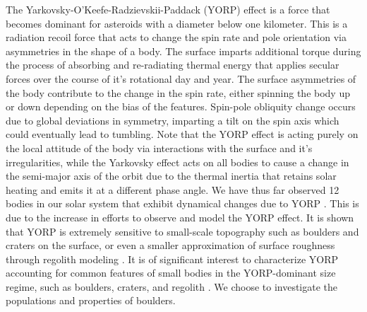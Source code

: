 The Yarkovsky-O'Keefe-Radzievskii-Paddack (YORP) effect is a force that becomes dominant for asteroids with a diameter below one kilometer. This is a radiation recoil force that acts to change the spin rate and pole orientation via asymmetries in the shape of a body. The surface imparts additional torque during the process of absorbing and re-radiating thermal energy that applies secular forces over the course of it's rotational day and year. The surface asymmetries of the body contribute to the change in the spin rate, either spinning the body up or down depending on the bias of the features. Spin-pole obliquity change occurs due to global deviations in symmetry, imparting a tilt on the spin axis which could eventually lead to tumbling. Note that the YORP effect is acting purely on the local attitude of the body via interactions with the surface and it's irregularities, while the Yarkovsky effect acts on all bodies to cause a change in the semi-major axis of the orbit due to the thermal inertia that retains solar heating and emits it at a different phase angle\citep{Vokrouhlicky2000}. We have thus far observed 12 bodies in our solar system that exhibit dynamical changes due to YORP \citep{Durech2023}. This is due to the increase in efforts to observe and model the YORP effect. It is shown that YORP is extremely sensitive to small-scale topography such as boulders and craters on the surface, or even a smaller approximation of surface roughness through regolith modeling \citep{Statler2009}\citep{Rozitis2011}\citep{Rozitis2013}. It is of significant interest to characterize YORP accounting for common features of small bodies in the YORP-dominant size regime, such as boulders, craters, and regolith \citep{Zhou2023}\citep{Walsh2019}. We choose to investigate the populations and properties of boulders. 


